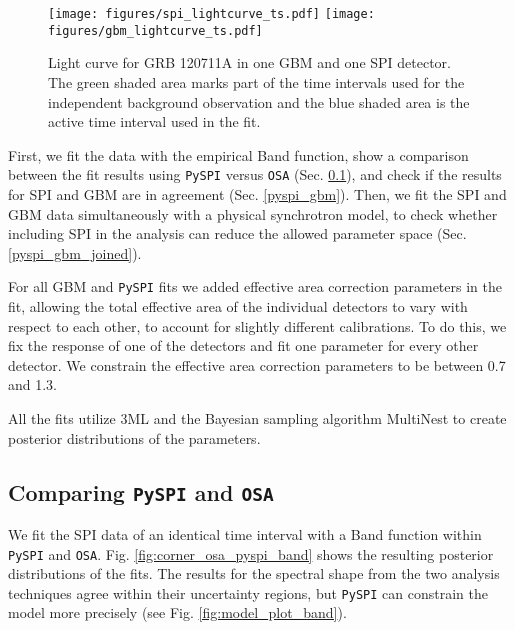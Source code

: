 \documentclass[twocolumn,traditabstract]{aa}
\begin{document}
\begin{figure}
  \begin{centering}
    \texttt{[image: figures/spi\_lightcurve\_ts.pdf]}
    \texttt{[image: figures/gbm\_lightcurve\_ts.pdf]}
    \caption{Light curve for GRB 120711A in one GBM and one SPI detector. The green shaded area marks part of the time intervals used for the independent background observation and the blue shaded area is the active time interval used in the fit.}
    \label{fig:time_selection}
  \end{centering}
\end{figure}

First, we fit the data with the empirical Band function, show a comparison between the fit results using {\tt PySPI} versus {\tt OSA} (Sec. \ref{pyspi_osa}), and check if the results for SPI and GBM are in agreement (Sec. \ref{pyspi_gbm}). Then, we fit the SPI and GBM data simultaneously with a physical synchrotron model, to check whether including SPI in the analysis can reduce the allowed parameter space (Sec. \ref{pyspi_gbm_joined}).

For all GBM and {\tt PySPI} fits we added effective area correction parameters in the fit, allowing the total effective area of the individual detectors to vary with respect to each other, to account for slightly different calibrations. To do this, we fix the response of one of the detectors
and fit one parameter for every other detector. We constrain the effective area correction parameters to be between 0.7 and 1.3.

All the fits utilize 3ML \citep{3ML} and the Bayesian sampling algorithm MultiNest \citep{multinest} to create posterior distributions of the parameters.



\subsection{Comparing {\tt PySPI} and {\tt OSA}}
\label{pyspi_osa}
We fit the SPI data of an identical time interval with a Band function
within {\tt PySPI} and {\tt OSA}.
Fig. \ref{fig:corner_osa_pyspi_band} shows the resulting posterior distributions of the fits. The results for the spectral shape from the two analysis techniques agree within their uncertainty regions, but {\tt PySPI} can constrain the model more precisely (see Fig. \ref{fig:model_plot_band}).
\end{document}
